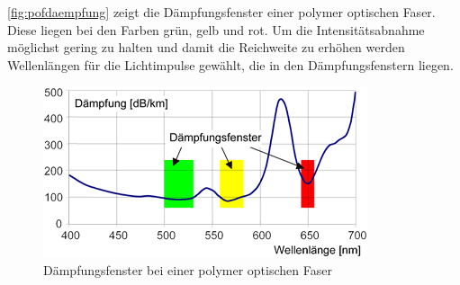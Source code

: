 \autoref{fig:pofdaempfung} zeigt die Dämpfungsfenster einer polymer optischen
Faser. Diese liegen bei den Farben grün, gelb und rot. Um die Intensitätsabnahme
möglichst gering zu halten und damit die Reichweite zu erhöhen werden
Wellenlängen für die Lichtimpulse gewählt, die in den Dämpfungsfenstern liegen.

\begin{figure}[h]
    \begin{center}
        \begin{minipage}[t]{0.4\textwidth}
            \begin{center}
                \includegraphics[height=0.1\textheight]{Bilder/Optische_Wellenleiter_Die_Polymer_Optische_Faser/Funktionsweise/pofdaempfung.png}
                \caption[Dämpfungsfenster bei einer polymer optischen Faser \newline \url{http://www.pofac.fh-nuernberg.de/pofac/de/was_sind_pof/images/pmma_daempfung.png}]{Dämpfungsfenster bei einer polymer optischen Faser}
                \label{fig:pofdaempfung}
            \end{center}
        \end{minipage}
    \end{center}
\end{figure}
